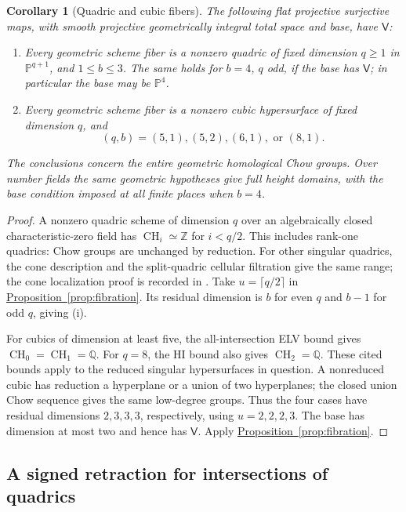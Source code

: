 \documentclass[11pt,a4paper]{article}
\newtheorem{corollary}[theorem]{Corollary}
\theoremstyle{definition}
\theoremstyle{remark}\newtheorem{remark}[theorem]{Remark}
\numberwithin{equation}{section}
\newcommand{\Q}{\mathbb Q}\newcommand{\R}{\mathbb R}\newcommand{\C}{\mathbb C}
\newcommand{\Z}{\mathbb Z}
\newcommand{\PP}{\mathbb P}\newcommand{\LL}{\mathbb L}
\newcommand{\CH}{\operatorname{CH}}\newcommand{\an}{\mathrm{an}}
\newcommand{\propref}[1]{\hyperref[#1]{\textcolor{resultlink}{Proposition~\ref*{#1}}}}
\begin{document}
\begin{corollary}[Quadric and cubic fibers]\label{cor:quad-cubic-fibers}
The following flat projective surjective maps, with smooth projective
geometrically integral total space and base, have $\mathsf V$:
\begin{enumerate}[label=\textup{(\roman*)}]
\item Every geometric scheme fiber is a nonzero quadric of fixed
dimension $q\geq1$ in $\PP^{q+1}$, and $1\leq b\leq3$.
The same holds for $b=4$, $q$ odd, if the base has $\mathsf V$;
in particular the base may be $\PP^4$.
\item Every geometric scheme fiber is a nonzero cubic hypersurface
of fixed dimension $q$, and
\[
 (q,b)=(5,1),(5,2),(6,1),\text{ or }(8,1).
\]
\end{enumerate}
The conclusions concern the entire geometric homological Chow
groups. Over number fields the same geometric hypotheses give
full height domains, with the base condition imposed at all
finite places when $b=4$.
\end{corollary}

\begin{proof}
A nonzero quadric scheme of dimension $q$ over an algebraically
closed characteristic-zero field has $\CH_i\simeq\Z$ for
$i<q/2$. This includes rank-one quadrics: Chow groups are
unchanged by reduction. For other singular quadrics, the cone
description and the split-quadric cellular filtration give the
same range; the cone localization proof is recorded in
\cite{InternalFibrations}. Take $u=\lceil q/2\rceil$ in
\propref{prop:fibration}. Its residual dimension is $b$ for even
$q$ and $b-1$ for odd $q$, giving (i).

For cubics of dimension at least five, the all-intersection
ELV bound gives $\CH_0=\CH_1=\Q$. For $q=8$, the HI bound
also gives $\CH_2=\Q$. These cited bounds apply to the reduced
singular hypersurfaces in question. A nonreduced cubic has
reduction a hyperplane or a union of two hyperplanes; the closed
union Chow sequence gives the same low-degree groups. Thus the
four cases have residual dimensions $2,3,3,3$, respectively,
using $u=2,2,2,3$. The base has dimension at most two and hence
has $\mathsf V$. Apply \propref{prop:fibration}.
\end{proof}

\subsection{A signed retraction for intersections of quadrics}
\end{document}
